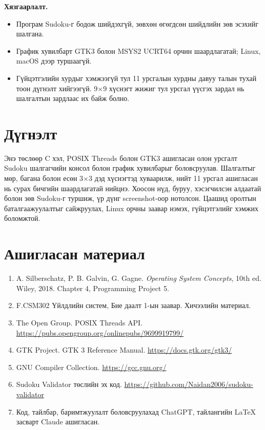 \documentclass[12pt,a4paper]{report}
\newcommand{\repo}{\url{https://github.com/Naidan2006/sudoku-validator}}
\begin{document}
\textbf{Хязгаарлалт.}
\begin{itemize}
\item Програм Sudoku-г бодож шийдэхгүй, зөвхөн өгөгдсөн шийдлийн зөв эсэхийг шалгана.
\item График хувилбарт GTK3 болон MSYS2 UCRT64 орчин шаардлагатай; Linux, macOS дээр туршаагүй.
\item Гүйцэтгэлийн хурдыг хэмжээгүй тул 11 урсгалын хурдны давуу талын тухай тоон дүгнэлт хийгээгүй. 9$\times$9 хүснэгт жижиг тул урсгал үүсгэх зардал нь шалгалтын зардлаас их байж болно.
\end{itemize}

\chapter{Дүгнэлт}
Энэ төслөөр C хэл, POSIX Threads болон GTK3 ашигласан олон урсгалт Sudoku шалгагчийн консол болон график хувилбарыг боловсруулав. Шалгалтыг мөр, багана болон есөн 3$\times$3 дэд хүснэгтэд хуваарилж, нийт 11 урсгал ашигласан нь сурах бичгийн шаардлагатай нийцнэ. Хоосон нүд, буруу, хэсэгчилсэн алдаатай болон зөв Sudoku-г туршиж, үр дүнг screenshot-оор нотолсон. Цаашид оролтын баталгаажуулалтыг сайжруулах, Linux орчны заавар нэмэх, гүйцэтгэлийг хэмжих боломжтой.

\chapter*{Ашигласан материал}
\begin{enumerate}
\item A. Silberschatz, P. B. Galvin, G. Gagne. \textit{Operating System Concepts}, 10th ed. Wiley, 2018. Chapter 4, Programming Project 5.
\item F.CSM302 Үйлдлийн систем, Бие даалт 1-ын заавар. Хичээлийн материал.
\item The Open Group. POSIX Threads API. \url{https://pubs.opengroup.org/onlinepubs/9699919799/}
\item GTK Project. GTK 3 Reference Manual. \url{https://docs.gtk.org/gtk3/}
\item GNU Compiler Collection. \url{https://gcc.gnu.org/}
\item Sudoku Validator төслийн эх код. \repo
\item Код, тайлбар, баримтжуулалт боловсруулахад ChatGPT, тайлангийн LaTeX засварт Claude ашигласан.
\end{enumerate}
\end{document}
